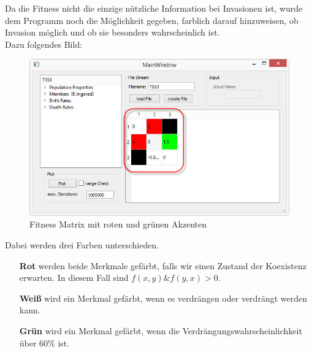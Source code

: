 \documentclass[11pt, a4paper, german]{article}
\theoremstyle{plain}
\begin{document}
	Da die Fitness nicht die einzige nützliche Information bei Invasionen ist, wurde dem Programm noch die Möglichkeit gegeben, farblich darauf hinzuweisen, ob Invasion möglich und ob sie besonders wahrscheinlich ist.\\
	Dazu folgendes Bild:
	\begin{figure}[H]
		\centering
		\includegraphics[width=1\linewidth]{./Pictures/MainWindow_red_green_loaded}
		\caption[MainWindow_redGreenFitness]{Fitness Matrix mit roten und grünen Akzenten}
		\label{fig:MainWindow_red_green_loaded}
	\end{figure}
	Dabei werden drei Farben unterschieden. 
	\begin{itemize}
		\item [\textbf{Rot}] werden beide Merkmale gefärbt, falls wir einen Zustand der Koexistenz erwarten. In diesem Fall sind $ f(x,y) \& f(y,x) > 0 $.
		\item [\textbf{Weiß}] wird ein Merkmal gefärbt, wenn es verdrängen oder verdrängt werden kann.
		\item [\textbf{Grün}] wird ein Merkmal gefärbt, wenn die Verdrängungswahrscheinlichkeit über 60\% ist.
	\end{itemize}
\end{document}
